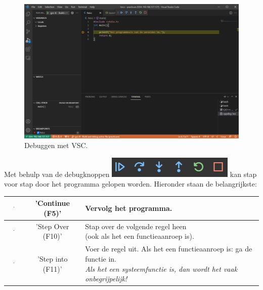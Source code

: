 \begin{enumerate}
\begin{figure}[h!]
\captionsetup{justification=centering}
\includegraphics[width=0.8 \linewidth]{figuren/VSCdebugVeld}
\centering
\caption{Debuggen met VSC.}
\label{fig:vscDebugVld}
\end{figure}     
   Met behulp van de debugknoppen \includegraphics[width=0.3 \linewidth]{figuren/VSCDebugKnoppen} kan stap voor stap door het programma gelopen worden. Hieronder staan de belangrijkste:

\begin{table}[h!] %
	\begin{tabular*}{6.6in}{ c | c | l }
		\hline
		\includegraphics[width=0.05\textwidth, height=8mm]{figuren/F5-Continue} & 'Continue (F5)' & Vervolg het programma. \\ \hline
		\includegraphics[width=0.05\textwidth, height=8mm]{figuren/F10-StepOver} & 'Step Over (F10)' & \specialcell{Stap over de volgende regel heen\\(ook als het een functieaanroep is).}  \\ \hline
		\includegraphics[width=0.05\textwidth, height=8mm]{figuren/F11-StepInto} & 'Step into (F11)' & \specialcell{Voer de regel uit. Als het een functieaanroep is: ga de functie in.\\ \textit{Als het een systeemfunctie is, dan wordt het vaak onbegrijpelijk!}}  \\ \hline
	\end{tabular*}
\end{table}

   
     \end{enumerate}
     
	
